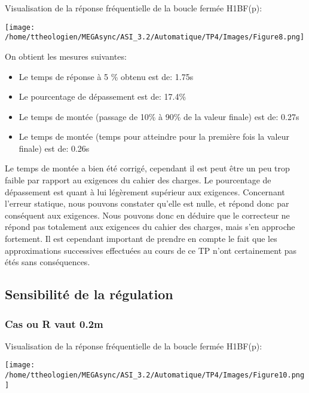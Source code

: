 \documentclass[a4paper,12pt]{article}
\begin{document}
			\par Visualisation de la réponse fréquentielle de la boucle fermée H1BF(p):
			\begin{center}
				\texttt{[image: /home/ttheologien/MEGAsync/ASI\_3.2/Automatique/TP4/Images/Figure8.png]}
			\end{center}

			\par On obtient les mesures suivantes:
			\begin{itemize}
				\item Le temps de réponse à 5 \% obtenu est de: 1.75s
				\item Le pourcentage de dépassement est de: 17.4\%
				\item Le temps de montée (passage de 10\% à 90\% de la valeur finale) est de: 0.27s
				\item Le temps de montée (temps pour atteindre pour la première fois la valeur finale) est de: 0.26s\\
			\end{itemize}
			\par Le temps de montée a bien été corrigé, cependant il est peut être un peu trop faible par rapport au exigences du cahier des charges.
			Le pourcentage de dépassement est quant à lui légèrement supérieur aux exigences.
			Concernant l'erreur statique, nous pouvons constater qu'elle est nulle, et répond donc par conséquent aux exigences.
			Nous pouvons donc en déduire que le correcteur ne répond pas totalement aux exigences du cahier des charges, mais s'en approche fortement.
			Il est cependant important de prendre en compte le fait que les approximations successives effectuées au cours de ce TP n'ont certainement pas étés sans conséquences.
			\pagebreak

		\subsection{Sensibilité de la régulation}
			\subsubsection{Cas ou R vaut 0.2m}
				\par Visualisation de la réponse fréquentielle de la boucle fermée H1BF(p):
				\begin{center}
					\texttt{[image: /home/ttheologien/MEGAsync/ASI\_3.2/Automatique/TP4/Images/Figure10.png]}
				\end{center}
\end{document}
